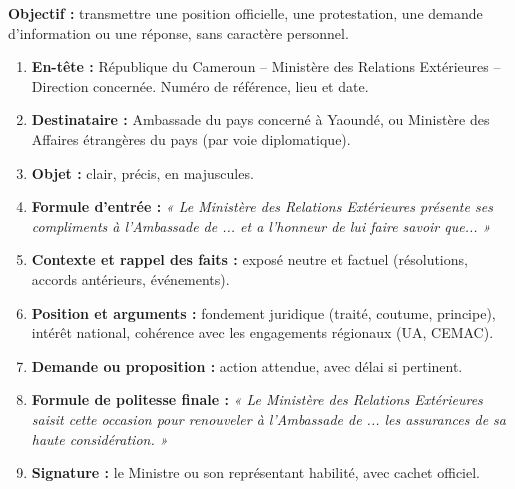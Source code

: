 \documentclass[11pt]{article}
\begin{document}
\begin{methode}
\textbf{Objectif :} transmettre une position officielle, une protestation, une demande d'information ou une réponse, sans caractère personnel.
\begin{enumerate}
    \item \textbf{En-tête :} République du Cameroun -- Ministère des Relations Extérieures -- Direction concernée. Numéro de référence, lieu et date.
    \item \textbf{Destinataire :} Ambassade du pays concerné à Yaoundé, ou Ministère des Affaires étrangères du pays (par voie diplomatique).
    \item \textbf{Objet :} clair, précis, en majuscules.
    \item \textbf{Formule d'entrée :} \emph{« Le Ministère des Relations Extérieures présente ses compliments à l'Ambassade de ... et a l'honneur de lui faire savoir que... »}
    \item \textbf{Contexte et rappel des faits :} exposé neutre et factuel (résolutions, accords antérieurs, événements).
    \item \textbf{Position et arguments :} fondement juridique (traité, coutume, principe), intérêt national, cohérence avec les engagements régionaux (UA, CEMAC).
    \item \textbf{Demande ou proposition :} action attendue, avec délai si pertinent.
    \item \textbf{Formule de politesse finale :} \emph{« Le Ministère des Relations Extérieures saisit cette occasion pour renouveler à l'Ambassade de ... les assurances de sa haute considération. »}
    \item \textbf{Signature :} le Ministre ou son représentant habilité, avec cachet officiel.
\end{enumerate}
\end{methode}
\end{document}
